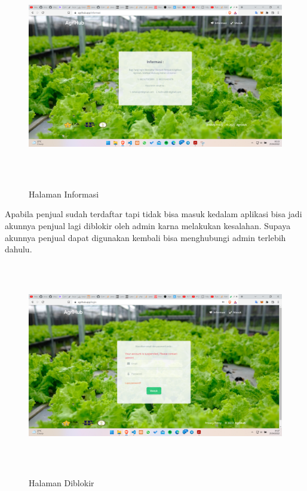 \begin{enumerate}
\begin{enumerate}
			\begin{figure}[H]
				\centering
				{\includegraphics [width = 14.3cm, height= 9cm]{gambar/informasi}}
				\caption{Halaman Informasi}
				\label{informasi}
			\end{figure}

			\par Apabila penjual sudah terdaftar tapi tidak bisa masuk kedalam aplikasi bisa jadi akunnya penjual lagi diblokir oleh admin karna melakukan kesalahan. Supaya akunnya penjual dapat digunakan kembali bisa menghubungi admin terlebih dahulu.

			\begin{figure}[H]
				\centering
				{\includegraphics [width = 14.3cm, height= 9cm]{gambar/diblokir}}
				\caption{Halaman Diblokir}
				\label{diblokir}
			\end{figure}


\end{enumerate}
\end{enumerate}
